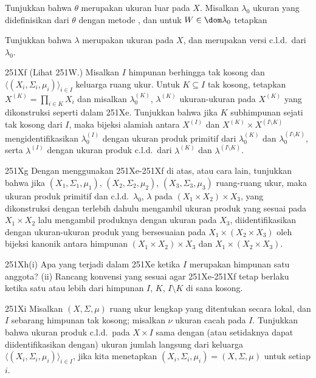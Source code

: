 {\noindent Tunjukkan bahwa $\theta$ merupakan ukuran luar pada $X$. Misalkan
$\lambda_0$ ukuran yang didefinisikan dari $\theta$ dengan metode \Caratheodory,
dan untuk $W\in\dom\lambda_0$ tetapkan


\noindent Tunjukkan bahwa $\lambda$ merupakan ukuran pada $X$, dan merupakan versi c.l.d.\
dari $\lambda_0$.

\sqheader 251Xf (Lihat 251W.) Misalkan $I$ himpunan berhingga tak kosong dan
$\langle(X_i,\Sigma_i,\mu_i)\rangle_{i\in I}$ keluarga ruang
ukur. Untuk $K\subseteq I$ tak kosong, tetapkan $X^{(K)}=\prod_{i\in K}X_i$
dan misalkan $\lambda_0^{(K)}$, $\lambda^{(K)}$ ukuran-ukuran pada $X^{(K)}$
yang dikonstruksi seperti dalam 251Xe. Tunjukkan bahwa jika $K$ subhimpunan sejati
tak kosong dari $I$, maka bijeksi alamiah antara $X^{(I)}$ dan
$X^{(K)}\times X^{(I\setminus K)}$ mengidentifikasikan $\lambda_0^{(I)}$ dengan
ukuran produk primitif dari $\lambda_0^{(K)}$ dan
$\lambda_0^{(I\setminus K)}$, serta $\lambda^{(I)}$ dengan ukuran produk
c.l.d.\ dari $\lambda^{(K)}$ dan $\lambda^{(I\setminus K)}$.

\sqheader 251Xg Dengan menggunakan 251Xe-251Xf di atas, atau cara lain, tunjukkan bahwa jika
$(X_1,\Sigma_1,\mu_1)$, $(X_2,\Sigma_2,\mu_2)$,
$(X_3,\Sigma_3,\mu_3)$ ruang-ruang ukur, maka ukuran produk primitif dan c.l.d.\
$\lambda_0$, $\lambda$ pada $(X_1\times X_2)\times X_3$, yang dikonstruksi dengan
terlebih dahulu mengambil ukuran produk yang sesuai pada $X_1\times X_2$ lalu
mengambil produknya dengan ukuran pada $X_3$, diidentifikasikan
dengan ukuran-ukuran produk yang bersesuaian pada $X_1\times(X_2\times X_3)$ oleh
bijeksi kanonik antara himpunan $(X_1\times X_2)\times X_3$ dan
$X_1\times(X_2\times X_3)$.

\spheader 251Xh(i) Apa yang terjadi dalam 251Xe ketika $I$ merupakan
himpunan satu anggota? (ii) Rancang konvensi yang sesuai agar 251Xe-251Xf
tetap berlaku ketika satu atau lebih dari himpunan $I$, $K$, $I\setminus K$ di sana
kosong.

\sqheader 251Xi Misalkan $(X,\Sigma,\mu)$ ruang ukur lengkap yang
ditentukan secara lokal, dan $I$ sebarang himpunan tak kosong; misalkan $\nu$
ukuran cacah pada $I$. Tunjukkan bahwa ukuran produk c.l.d.\ pada
$X\times I$ sama dengan (atau setidaknya dapat diidentifikasikan dengan) ukuran
jumlah langsung dari keluarga $\langle(X_i,\Sigma_i,\mu_i)\rangle_{i\in I}$,
jika kita menetapkan $(X_i,\Sigma_i,\mu_i)=(X,\Sigma,\mu)$ untuk setiap $i$.

}
